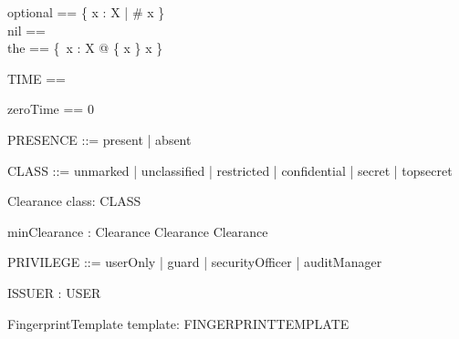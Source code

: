 \begin{gendef}[X]
 optional == \{ x : \finset X | \# x \} \\
 nil == \emptyset[X] \\
 the == \{~x : X @ \{ x \} \mapsto x \}
\end{gendef}

\begin{zed}
	TIME == \nat
\end{zed}

\begin{zed}
        zeroTime == 0
\end{zed}

\begin{zed}
	PRESENCE ::= present | absent
\end{zed}

\begin{zed}
	CLASS ::= unmarked | unclassified | restricted | confidential |
		secret | topsecret
\end{zed}

\begin{schema}{Clearance}
	class: CLASS
\end{schema}

\begin{axdef}
        minClearance : Clearance \cross Clearance \fun Clearance
\end{axdef}

\begin{zed}
        PRIVILEGE ::= userOnly | guard | securityOfficer | auditManager 
\end{zed}

\begin{zed}
[ USER ]
\end{zed}

\begin{axdef}
ISSUER : \power USER
\end{axdef}

\begin{zed}
[ FINGERPRINT ]
\end{zed}

\begin{zed}
[ FINGERPRINTTEMPLATE ]
\end{zed}

\begin{schema}{FingerprintTemplate}
	template: FINGERPRINTTEMPLATE
\end{schema}

\begin{zed}
        [ KEYPART ]
\end{zed}

